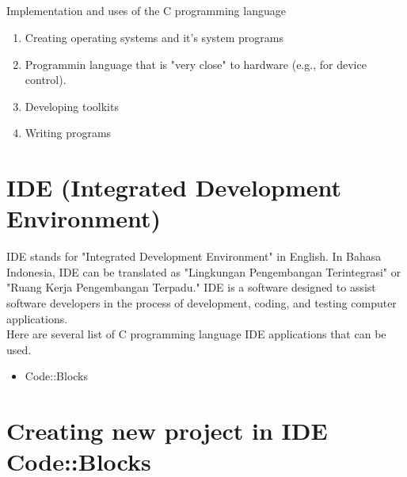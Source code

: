 \subsection*{}Implementation and uses of the C programming language
\begin{enumerate}
	\item Creating operating systems and it's system programs
	\item Programmin language that is "very close" to hardware (e.g., for device control).
	\item Developing toolkits
	\item Writing programs
\end{enumerate}
\section{IDE (Integrated Development Environment)}
IDE stands for "Integrated Development Environment" in English. In Bahasa Indonesia, IDE can be translated as "Lingkungan Pengembangan Terintegrasi" or "Ruang Kerja Pengembangan Terpadu." IDE is a software designed to assist software developers in the process of development, coding, and testing computer applications.
\\
Here are several list of C programming language IDE applications that can be used.
\begin{itemize}
	\item Code::Blocks
\end{itemize}
\section{Creating new project in IDE Code::Blocks}

